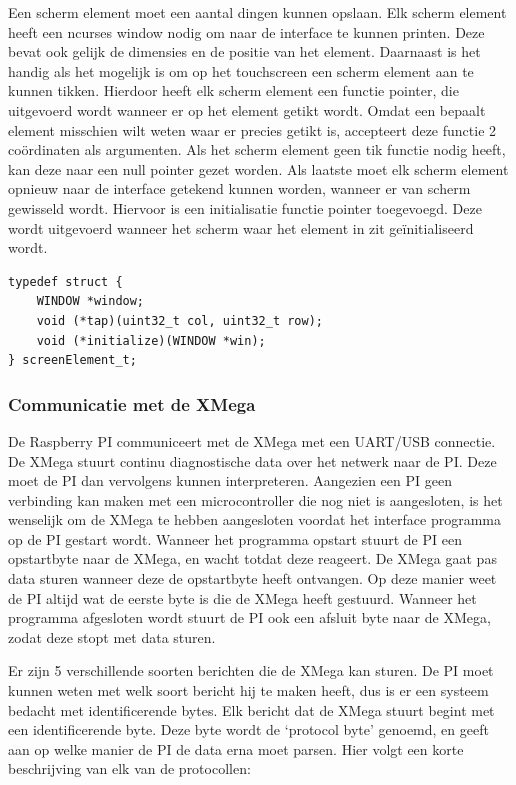 Een scherm element moet een aantal dingen kunnen opslaan. Elk scherm element heeft een ncurses window nodig om naar de interface te kunnen printen. Deze bevat ook gelijk de dimensies en de positie van het element.
Daarnaast is het handig als het mogelijk is om op het touchscreen een scherm element aan te kunnen tikken. Hierdoor heeft elk scherm element een functie pointer, die uitgevoerd wordt wanneer er op het element getikt wordt. Omdat een bepaalt element misschien wilt weten waar er precies getikt is, accepteert deze functie 2 coördinaten als argumenten. Als het scherm element geen tik functie nodig heeft, kan deze naar een null pointer gezet worden. Als laatste moet elk scherm element opnieuw naar de interface getekend kunnen worden, wanneer er van scherm gewisseld wordt. Hiervoor is een initialisatie functie pointer toegevoegd. Deze wordt uitgevoerd wanneer het scherm waar het element in zit geïnitialiseerd wordt.

\begin{lstlisting}[caption={Het datatype van de scherm elementen},captionpos=b,label={lst:screenElement_t},style=c,xleftmargin=.\textwidth,xrightmargin=.\textwidth]
typedef struct {
    WINDOW *window;
    void (*tap)(uint32_t col, uint32_t row);
    void (*initialize)(WINDOW *win);
} screenElement_t;    
\end{lstlisting}

\subsubsection*{Communicatie met de XMega}

De Raspberry PI communiceert met de XMega met een UART/USB connectie. De XMega stuurt continu diagnostische data over het netwerk naar de PI. Deze moet de PI dan vervolgens kunnen interpreteren. Aangezien een PI geen verbinding kan maken met een microcontroller die nog niet is aangesloten, is het wenselijk om de XMega te hebben aangesloten voordat het interface programma op de PI gestart wordt. Wanneer het programma opstart stuurt de PI een opstartbyte naar de XMega, en wacht totdat deze reageert. De XMega gaat pas data sturen wanneer deze de opstartbyte heeft ontvangen. Op deze manier weet de PI altijd wat de eerste byte is die de XMega heeft gestuurd. Wanneer het programma afgesloten wordt stuurt de PI ook een afsluit byte naar de XMega, zodat deze stopt met data sturen.

Er zijn 5 verschillende soorten berichten die de XMega kan sturen. De PI moet kunnen weten met welk soort bericht hij te maken heeft, dus is er een systeem bedacht met identificerende bytes. Elk bericht dat de XMega stuurt begint met een identificerende byte. Deze byte wordt de `protocol byte' genoemd, en geeft aan op welke manier de PI de data erna moet parsen. Hier volgt een korte beschrijving van elk van de protocollen:

